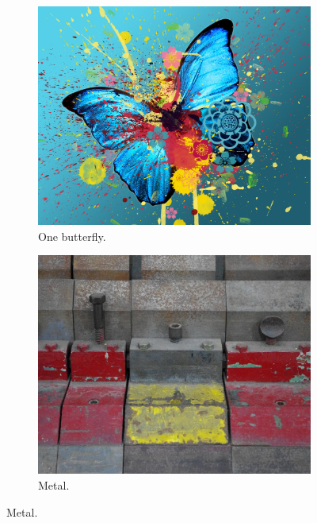 \begin{figure}[h]
  \begin{subfigure}{\exampleWidth}  \includegraphics[width=\linewidth]{graphics/color3}   \caption{One butterfly.}    \label{fig:scene_s_but}  \end{subfigure}
  \begin{subfigure}{\exampleWidth}  \includegraphics[width=\linewidth]{graphics/lines1}   \caption{Metal.}            \label{fig:scene_metal}  \end{subfigure}

\end{figure}
